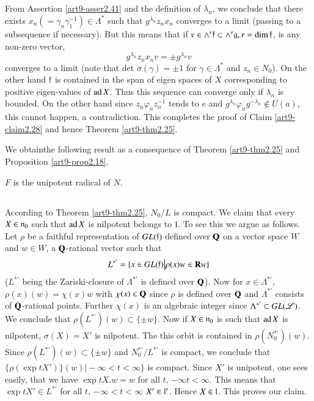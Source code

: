 \subsection{}\label{art9-subsec42}
From Assertion \ref{art9-asser2.41} and the definition of $\lambda_n$, we conclude that there exists $x_n (=\gamma_n \gamma_1^{-1}) \in \Lambda^\ast$ such that $g^{\lambda_n} z_n x_n$ converges to a limit (passing to a subsequence if necessary). But this means that if $v \in \wedge^r \mathfrak{f} \subset \wedge^r \mathfrak{g}, r = \dim \mathfrak{f}$, is any non-zero vector,
$$
g^{\lambda_n} z_n x_n v = \pm g^{\lambda_n} v
$$
converges to a limit (note that det $\sigma (\gamma) = \pm 1$ for $\gamma \in \Lambda^\ast$ and $z_n\in N_0$). On the other hand $\mathfrak{f}$ is contained in the span of eigen spaces of $X$ corresponding to positive eigen-values of $\operatorname{ad} X$. Thus this sequence can converge only if $\lambda_n$ is bounded. On the other hand since $z_n \varphi_n z_n^{-1}$  tends to $e$ and $g^{\lambda_n} \varphi_n g^{-\lambda_n} \not\in U (a)$, this cannot happen, a contradiction. This completes the proof of Claim \ref{art9-claim2.28} and hence Theorem \ref{art9-thm2.25}.

We obtain\pageoriginale the following result as a consequence of Theorem \ref{art9-thm2.25} and Proposition \ref{art9-prop2.18}.

\setcounter{theorem}{42}
\begin{theorem}\label{art9-thm2.43}
$F$ is the unipotent radical of $N$.
\end{theorem}

\setcounter{subsection}{43}
\subsection{}\label{art9-subsec2.44}
According to Theorem \ref{art9-thm2.25}, $N_0 / L$ is compact. We claim that every $X \in \mathfrak{n}_0$ such that $\operatorname{ad} X$ is nilpotent belongs to $\mathfrak{l}$. To see this we argue as follows. Let $\rho$ be a faithful representation of $GL(\mathfrak{f})$ defined over $\mathbf{Q}$ on a vector space $W$ and $w \in W$, a $\mathbf{Q}$-rational vector such that 
$$
L^{\ast'} = \{x \in G L (\mathfrak{f}) \big| \rho (x)w \in \mathbf{R} w\}
$$
($L^{\ast'}$ being the Zariski-closure of $\Lambda^{\ast'}$ is defined over $\mathbf{Q}$). Now for $x \in \Lambda^{\ast'}$, $\rho (x) (w) = \chi (x) w$ with $\chi (x) \in \mathbf{Q}$ since $\rho$ is defined over $\mathbf{Q}$ and $\Lambda^{\ast'}$ consists of $\mathbf{Q}$-rational points. Further $\chi (x)$ is an algebraic integer since $\Lambda^{\ast'} \subset GL (\mathscr{L})$. We conclude that $\rho (L^{\ast'}) (w) \subset \{\pm w\}$. Now if $X \in \mathfrak{n}_0$ is such that $\operatorname{ad} X$ is nilpotent, $\sigma (X) = X'$ is nilpotent. The this orbit is contained in $ \rho (N^{\ast'}_0) (w)$. Since $\rho (L^{\ast'}) (w) \subset \{\pm w\}$ and $N^{\ast'}_0 / L^{\ast'}$ is compact, we conclude that $\{\rho (\exp t X')\} (w) \big| - \infty < t < \infty\}$ is compact. Since $X'$ is unipotent, one sees easily, that we have $\exp t X. w = w$ for all $t$, $-\infty t < \infty$. This means that $\exp t X' \in L^{\ast'}$ for all $t$, $-\infty < t < \infty$ \ie $X' \in \mathfrak{l}'$. Hence $X \in \mathfrak{l}$. This proves our claim.

